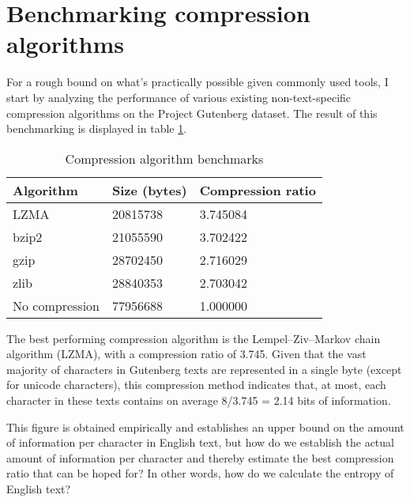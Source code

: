 \section{Benchmarking compression algorithms}

For a rough bound on what's practically possible given commonly used tools, I start by analyzing the performance of various existing non-text-specific compression algorithms on the Project Gutenberg dataset. The result of this benchmarking is displayed in table \ref{tab:compalg_benchmarks}.

\begin{table}[ht]
\centering
\begin{tabular}{ |p{3cm}||p{4cm}|p{3cm}|  }
 \hline
 Algorithm & Size (bytes) & Compression ratio\\
 \hline
    LZMA & 20815738 & 3.745084\\
    bzip2 & 21055590 & 3.702422\\
    gzip & 28702450 & 2.716029\\
    zlib & 28840353 & 2.703042\\
    No compression & 77956688 & 1.000000\\
 \hline
\end{tabular}
\caption{Compression algorithm benchmarks
\label{tab:compalg_benchmarks}}
\end{table}

The best performing compression algorithm is the Lempel–Ziv–Markov chain algorithm (LZMA), with a compression ratio of 3.745. Given that the vast majority of characters in Gutenberg texts are represented in a single byte (except for unicode characters), this compression method indicates that, at most, each character in these texts contains on average 8/3.745 = 2.14 bits of information.

This figure is obtained empirically and establishes an upper bound on the amount of information per character in English text, but how do we establish the actual amount of information per character and thereby estimate the best compression ratio that can be hoped for? In other words, how do we calculate the entropy of English text?